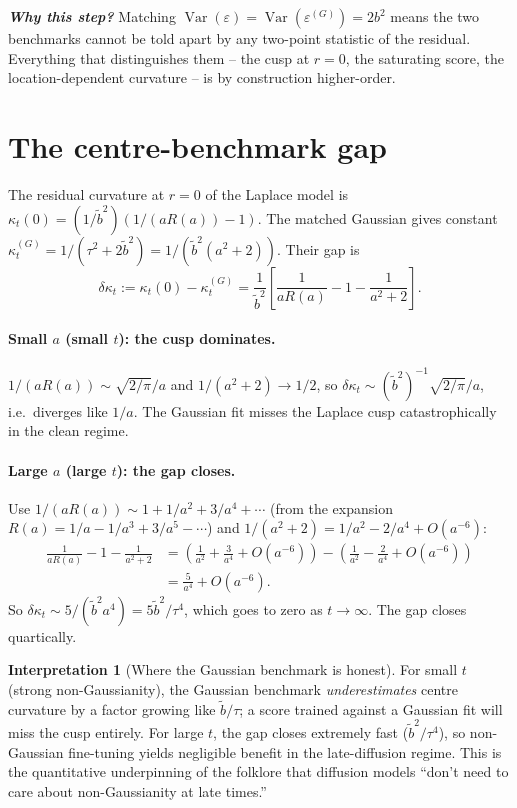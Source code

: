 \documentclass[11pt,a4paper,openany]{book}
\theoremstyle{plainserif}
\theoremstyle{definition}
\theoremstyle{remarkstyle}
\newtheorem*{interpretation}{Interpretation}
\newenvironment{whybox}{%
  \begin{center}\begin{minipage}{0.95\linewidth}\small
  \textbf{\textit{Why this step?}}\quad\ignorespaces}{%
  \end{minipage}\end{center}}
\newcommand{\V}{\operatorname{Var}}
\newcommand{\btilde}{\tilde{b}}
\newcommand{\mills}{R}
\begin{document}
\begin{whybox}
Matching $\V(\varepsilon) = \V(\varepsilon^{(G)}) = 2b^2$ means the two
benchmarks cannot be told apart by any two-point statistic of the
residual. Everything that distinguishes them -- the cusp at $r=0$, the
saturating score, the location-dependent curvature -- is by construction
higher-order.
\end{whybox}

\section{The centre-benchmark gap}

The residual curvature at $r=0$ of the Laplace model is
$\kappa_t(0) = (1/\btilde^2)(1/(a\mills(a)) - 1)$.
The matched Gaussian gives constant $\kappa_t^{(G)} = 1/(\tau^2 + 2\btilde^2)
= 1/(\btilde^2(a^2 + 2))$. Their gap is
\begin{equation}
\delta\kappa_t := \kappa_t(0) - \kappa_t^{(G)}
= \frac{1}{\btilde^2}\left[\frac{1}{a\mills(a)} - 1 - \frac{1}{a^2 + 2}\right].
\label{eq:gap-exact}
\end{equation}

\paragraph{Small $a$ (small $t$): the cusp dominates.}
$1/(a\mills(a)) \sim \sqrt{2/\pi}/a$ and $1/(a^2+2) \to 1/2$, so
$\delta\kappa_t \sim (\btilde^2)^{-1}\sqrt{2/\pi}/a$, i.e.\ diverges
like $1/a$. The Gaussian fit misses the Laplace cusp catastrophically
in the clean regime.

\paragraph{Large $a$ (large $t$): the gap closes.}
Use $1/(a\mills(a)) \sim 1 + 1/a^2 + 3/a^4 + \cdots$ (from the expansion
$\mills(a) = 1/a - 1/a^3 + 3/a^5 - \cdots$) and
$1/(a^2 + 2) = 1/a^2 - 2/a^4 + O(a^{-6})$:
\begin{align}
\frac{1}{a\mills(a)} - 1 - \frac{1}{a^2+2}
 &= \left(\frac{1}{a^2} + \frac{3}{a^4} + O(a^{-6})\right)
    - \left(\frac{1}{a^2} - \frac{2}{a^4} + O(a^{-6})\right) \nonumber \\
 &= \frac{5}{a^4} + O(a^{-6}).
\end{align}
So $\delta\kappa_t \sim 5/(\btilde^2 a^4) = 5\btilde^2/\tau^4$, which
goes to zero as $t\to\infty$. The gap closes quartically.

\begin{interpretation}[Where the Gaussian benchmark is honest]
For small $t$ (strong non-Gaussianity), the Gaussian benchmark
\emph{underestimates} centre curvature by a factor growing like $\btilde/\tau$;
a score trained against a Gaussian fit will miss the cusp entirely.
For large $t$, the gap closes extremely fast ($\btilde^2/\tau^4$), so
non-Gaussian fine-tuning yields negligible benefit in the
late-diffusion regime. This is the quantitative underpinning of the
folklore that diffusion models ``don't need to care about non-Gaussianity
at late times.''
\end{interpretation}
\end{document}
